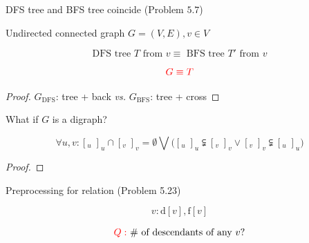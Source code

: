 \begin{frame}{}
  \begin{exampleblock}{DFS tree and BFS tree coincide (Problem $5.7$)}
    \centerline{Undirected connected graph $G = (V,E), v \in V$}
      
    \[
      \text{DFS tree } T \text{ from } v \equiv \text{ BFS tree } T' \text{ from } v
    \]

    \pause
    \[
      \textcolor{red}{G \equiv T}
    \]
  \end{exampleblock}

  \pause
  \vspace{0.30cm}
  \begin{proof}
    \centerline{$G_{\text{DFS}}$: tree + back \emph{vs.} $G_{\text{BFS}}$: tree + cross}
  \end{proof}

  \pause
  \vspace{0.30cm}
  \begin{center}
     What if $G$ is a digraph?
  \end{center}
\end{frame}
\begin{frame}{}
  \centerline{}
\end{frame}
\begin{frame}{}
  \begin{theorem}
    \[
      \forall u,v: [_{u} \; ]_{u} \cap [_{v} \; ]_{v} = \emptyset \bigvee 
      \Big([_{u} \; ]_{u} \subsetneqq [_{v} \; ]_{v} \lor [_{v} \; ]_{v} \subsetneqq [_{u} \; ]_{u}\Big)
    \]
  \end{theorem}

  \pause

  \begin{proof}
  \end{proof}
\end{frame}
\begin{frame}{}
  \begin{exampleblock}{Preprocessing for  relation (Problem 5.23)}

    \centerline{}
  \end{exampleblock}

  \pause
  \[
    v: \text{d}[v], \text{f}[v]
  \]

  \pause
  \vspace{-0.20cm}
  \[
    \textcolor{red}{Q: } \text{ \# of descendants of any } v?
  \]
\end{frame}

